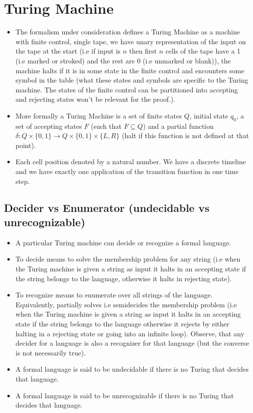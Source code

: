 \documentclass[
11pt,notheorems,hyperref={pdfauthor=whatever}
]{beamer}
\begin{document}
\section{Turing Machine}
\begin{frame}
\begin{itemize}
    \setlength\itemsep{1em}
    \item The formalism under consideration defines a Turing Machine as a machine with finite control, single tape, we have unary representation of the input on the tape at the start (i.e if input is $n$ then first $n$ cells of the tape have a 1 (i.e marked or stroked) and the rest are 0 (i.e unmarked or blank)), the machine halts if it is in some state in the finite control and encounters some symbol in the table (what these states and symbols are specific to the Turing machine. The states of the finite control can be partitioned into accepting and rejecting states won't be relevant for the proof.).
    \item More formally a Turing Machine is a set of finite states $Q$, initial state $q_0$, a set of accepting states $F$ (such that $F \subseteq Q$) and a partial function $\delta : Q \times \{0, 1\} \to Q \times \{0, 1\} \times \{L, R\}$ (halt if this function is not defined at that point).
    \item Each cell position denoted by a natural number. We have a discrete timeline and we have exactly one application of the transition function in one time step.
\end{itemize}
\end{frame}

\subsection{Decider vs Enumerator (undecidable vs unrecognizable)}
\begin{frame}
\begin{itemize}
    \setlength\itemsep{1em}
    \item A particular Turing machine can decide or recognize a formal language.
    \item To decide means to solve the membership problem for any string (i.e when the Turing machine is given a string as input it halts in an accepting state if the string belongs to the language, otherwise it halts in rejecting state).
    \item To recognize means to enumerate over all strings of the language. Equivalently, partially solves i.e semidecides the membership problem (i.e when the Turing machine is given a string as input it halts in an accepting state if the string belongs to the language otherwise it rejects by either halting in a rejecting state or going into an infinite loop). Observe, that any decider for a language is also a recognizer for that language (but the converse is not necessarily true).
    \item A formal language is said to be undecidable if there is no Turing that decides that language.
    \item A formal language is said to be unrecognizable if there is no Turing that decides that language.
\end{itemize}
\end{frame}
\end{document}
